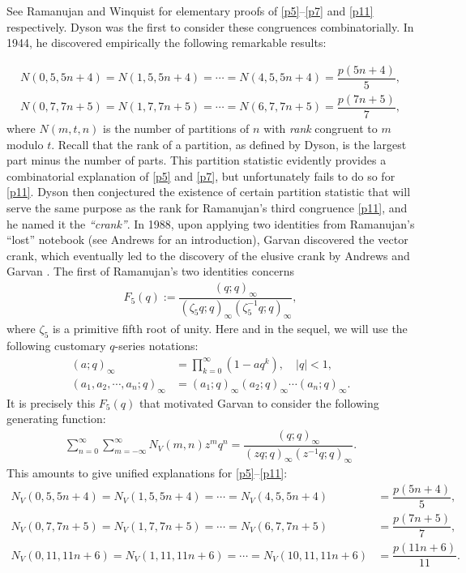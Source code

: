 \documentclass[12pt]{amsart}
\numberwithin{equation}{section}
\theoremstyle{plain}
\theoremstyle{definition}
\begin{document}
See Ramanujan \cite{Ram} and Winquist \cite{Win} for elementary proofs of \eqref{p5}--\eqref{p7} and \eqref{p11} respectively. Dyson \cite{Dys} was the first to consider these congruences combinatorially. In 1944, he discovered empirically the following remarkable results:

\begin{align*}
N(0,5,5n+4)=N(1,5,5n+4)=\cdots=N(4,5,5n+4)=\dfrac{p(5n+4)}{5},\\
N(0,7,7n+5)=N(1,7,7n+5)=\cdots=N(6,7,7n+5)=\dfrac{p(7n+5)}{7},
\end{align*}
where $N(m,t,n)$ is the number of partitions of $n$ with \emph{rank} congruent to $m$ modulo $t$. Recall that the rank of a partition, as defined by Dyson, is the largest part minus the number of parts. This partition statistic evidently provides a combinatorial explanation of \eqref{p5} and \eqref{p7}, but unfortunately fails to do so for \eqref{p11}. Dyson \cite{Dys} then conjectured the existence of certain partition statistic that will serve the same purpose as the rank for Ramanujan's third congruence \eqref{p11}, and he named it the \emph{``crank''}. In 1988, upon applying two identities from Ramanujan's ``lost'' notebook (see Andrews \cite{And} for an introduction), Garvan \cite{Gar} discovered the vector crank, which eventually led to the discovery of the elusive crank by Andrews and Garvan \cite{AG1}. The first of Ramanujan's two identities concerns
\begin{align*}
F_5(q):=\dfrac{(q;q)_{\infty}}{(\zeta_5q;q)_{\infty}(\zeta_5^{-1}q;q)_{\infty}},
\end{align*}
where $\zeta_5$ is a primitive fifth root of unity. Here and in the sequel, we will use the following customary $q$-series notations:
\begin{align*}
(a;q)_{\infty} &=\prod_{k=0}^{\infty}(1-aq^{k}),\quad |q|<1,\\
(a_{1},a_{2},\cdots,a_{n};q)_{\infty}&=(a_{1};q)_{\infty}(a_{2};q)_{\infty}\cdots(a_{n};q)_{\infty}.
\end{align*}
It is precisely this $F_5(q)$ that motivated Garvan to consider the following generating function:
\begin{align*}
\sum_{n=0}^{\infty}\sum_{m=-\infty}^{\infty}N_{V}(m,n)z^{m}q^{n}=\dfrac{(q;q)_{\infty}}{(zq;q)_{\infty}(z^{-1}q;q)_{\infty}}.
\end{align*}
This amounts to give unified explanations for \eqref{p5}--\eqref{p11}:
\begin{align}
\label{NV5}N_V(0,5,5n+4)=N_V(1,5,5n+4)=\cdots=N_V(4,5,5n+4) &=\dfrac{p(5n+4)}{5},\\
\label{NV7}N_V(0,7,7n+5)=N_V(1,7,7n+5)=\cdots=N_V(6,7,7n+5) &=\dfrac{p(7n+5)}{7},\\
\label{NV11}N_V(0,11,11n+6)=N_V(1,11,11n+6)=\cdots=N_V(10,11,11n+6) &=\dfrac{p(11n+6)}{11}.
\end{align}
\end{document}
